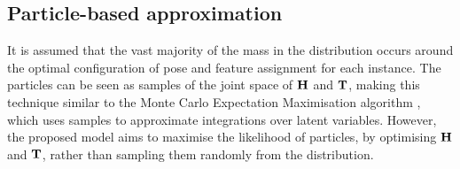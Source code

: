 \def\spfparticlem{\particle_{\anyinstance}  =  \anyparticle}
\def\spfparticle{\particle  =  \anyparticle} 
\subsection{Particle-based approximation}
\label{sec/reg/particlebasedapprox}
It is assumed that the vast majority of the mass in the distribution occurs around the optimal configuration of pose and feature assignment for each instance. The particles can be seen as samples of the joint space of $\mathbf{H}$ and $\mathbf{T}$, making this technique similar to the Monte Carlo Expectation Maximisation algorithm \cite{Levine2001, Wei1990}, which uses samples to approximate integrations over latent variables. However, the proposed model aims to maximise the likelihood of particles, by optimising $\mathbf{H}$ and $\mathbf{T}$, rather than sampling them randomly from the distribution. 

